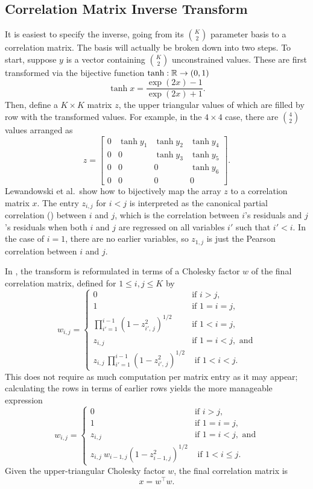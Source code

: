 \subsection{Correlation Matrix Inverse Transform}

It is easiest to specify the inverse, going from its $\binom{K}{2}$
parameter basis to a correlation matrix.  The basis will actually be
broken down into two steps.  To start, suppose $y$ is a vector
containing $\binom{K}{2}$ unconstrained values.  These are first
transformed via the bijective function $\tanh : \reals \rightarrow
(0,1)$
%
\[
\tanh x = \frac{\exp(2x) - 1}{\exp(2x) + 1}.
\]
%
Then, define a $K \times K$ matrix $z$, the upper triangular values of
which are filled by row with the transformed values.  For example, in
the $4 \times 4$ case, there are $\binom{4}{2}$ values arranged as
%
\[
z
=
\left[
\begin{array}{cccc}
0 & \tanh y_1 & \tanh y_2 & \tanh y_4
\\
0 & 0 & \tanh y_3 & \tanh y_5
\\
0 & 0 & 0 & \tanh y_6
\\
0 & 0 & 0 & 0
\end{array}
\right]
.
\]
%
Lewandowski et al.\ show how to bijectively map the array $z$ to a correlation
matrix $x$.  The entry $z_{i,j}$ for $i < j$ is interpreted as the
canonical partial correlation (\CPC) between $i$ and $j$, which is the
correlation between $i$'s residuals and $j$'s residuals when both $i$
and $j$ are regressed on all variables $i'$ such that $i'< i$.
In the case of $i=1$, there are no earlier variables,
so $z_{1,j}$ is just the Pearson correlation between $i$ and $j$.

In \Stan, the \LKJ transform is reformulated in terms of a Cholesky factor $w$
of the final correlation matrix, defined for $1 \leq i,j \leq K$ by
%
\[
w_{i,j} =
\left\{
\begin{array}{cl}
%
0 & \mbox{if } i > j,
\\[4pt]
1 & \mbox{if } 1 = i = j,
\\[12pt]
\prod_{i'=1}^{i - 1} \left( 1 - z_{i'\!,\,j}^2 \right)^{1/2}
& \mbox{if } 1 < i = j,
\\[12pt]
z_{i,j} & \mbox{if } 1 = i < j, \mbox{ and}
\\[12pt]
z_{i,j} \, \prod_{i'=1}^{i-1} \left( 1 - z_{i'\!,\,j}^2 \right)^{1/2}
& \mbox{ if } 1 < i < j.
%
\end{array}
\right.
\]
%
This does not require as much computation per matrix entry as it may appear;
calculating the rows in terms of earlier rows yields the more
manageable expression
%
\[
w_{i,j} =
\left\{
\begin{array}{cl}
%
0 & \mbox{if } i > j,
\\[4pt]
1 & \mbox{if } 1 = i = j,
\\[8pt]
z_{i,j} & \mbox{if } 1 = i < j, \mbox{ and}
\\[8pt]
z_{i,j} \ w_{i-1,j} \left( 1 - z_{i-1,j}^2 \right)^{1/2}
& \mbox{ if } 1 < i \leq j.
%
\end{array}
\right.
\]
Given the upper-triangular Cholesky factor $w$, the final correlation
matrix is
\[
x = w^{\top} w.
\]

